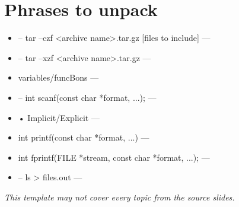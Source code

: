 \documentclass[12pt]{article}
\begin{document}
\section*{Phrases to unpack}
\begin{itemize}[leftmargin=*]
  \item – tar –czf <archive name>.tar.gz [files to include] --- \hrulefill
  \vspace{1.1em}
  \item – tar –xzf <archive name>.tar.gz --- \hrulefill
  \vspace{1.1em}
  \item variables/funcBons --- \hrulefill
  \vspace{1.1em}
  \item – int scanf(const char *format, ...); --- \hrulefill
  \vspace{1.1em}
  \item • Implicit/Explicit --- \hrulefill
  \vspace{1.1em}
  \item int printf(const char *format, ...) --- \hrulefill
  \vspace{1.1em}
  \item int fprintf(FILE *stream, const char *format, ...); --- \hrulefill
  \vspace{1.1em}
  \item – ls > files.out --- \hrulefill
  \vspace{1.1em}
\end{itemize}
\vspace{2em}
\begin{center}
\textit{This template may not cover every topic from the source slides.}
\end{center}
\end{document}

